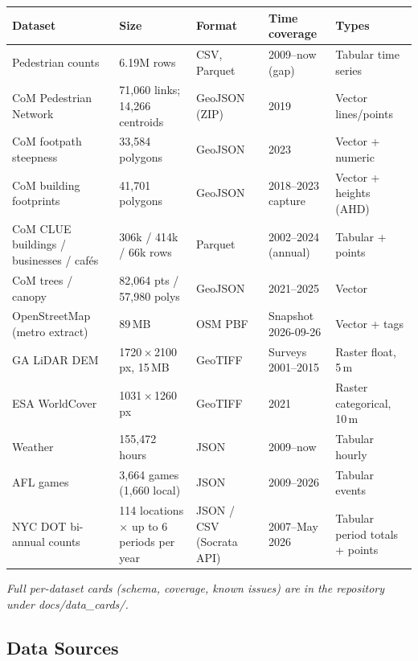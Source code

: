 \documentclass[11pt]{article}
\newcommand{\hrow}{\rowcolor{headgray}}
\begin{document}
\begin{xltabular}{\linewidth}{|L{3.5cm}|L{2.9cm}|L{1.8cm}|L{2.3cm}|Y|}
\hline\hrow
\textbf{Dataset} & \textbf{Size} & \textbf{Format} & \textbf{Time coverage} & \textbf{Types} \\\hline
\endhead
Pedestrian counts & 6.19M rows & CSV, Parquet & 2009--now (gap) & Tabular time series \\\hline
CoM Pedestrian Network & 71,060 links; 14,266 centroids & GeoJSON (ZIP) & 2019 & Vector lines/points \\\hline
CoM footpath steepness & 33,584 polygons & GeoJSON & 2023 & Vector + numeric \\\hline
CoM building footprints & 41,701 polygons & GeoJSON & 2018--2023 capture & Vector + heights (AHD) \\\hline
CoM CLUE buildings / businesses / cafés & 306k / 414k / 66k rows & Parquet & 2002--2024 (annual) & Tabular + points \\\hline
CoM trees / canopy & 82,064 pts / 57,980 polys & GeoJSON & 2021--2025 & Vector \\\hline
OpenStreetMap (metro extract) & 89\,MB & OSM PBF & Snapshot 2026-09-26 & Vector + tags \\\hline
GA LiDAR DEM & 1720\,$\times$\,2100\,px, 15\,MB & GeoTIFF & Surveys 2001--2015 & Raster float, 5\,m \\\hline
ESA WorldCover & 1031\,$\times$\,1260\,px & GeoTIFF & 2021 & Raster categorical, 10\,m \\\hline
Weather & 155,472 hours & JSON & 2009--now & Tabular hourly \\\hline
AFL games & 3,664 games (1,660 local) & JSON & 2009--2026 & Tabular events \\\hline
NYC DOT bi-annual counts & 114 locations $\times$ up to 6 periods per year & JSON / CSV (Socrata API) & 2007--May 2026 & Tabular period totals + points \\\hline
\end{xltabular}

\textit{Full per-dataset cards (schema, coverage, known issues) are in the repository under docs/data\_cards/.}

\subsection{Data Sources}
\end{document}
